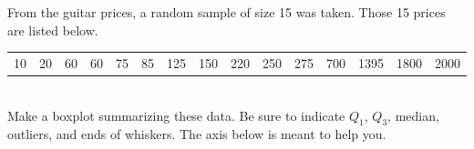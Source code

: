 \documentclass[12pt,letterpaper,addpoints]{exam}
\begin{document}
\begin{questions}

\newpage

\question[8] From the guitar prices, a random sample of size 15 was taken. Those 15 prices are listed below.

\begin{center}
\begin{tabular}{c c c c c c c c c c c c c c c}
10&20&60&60&75&85&125&150&220&250&275&700&1395&1800&2000
\end{tabular}
\end{center}

\\
Make a boxplot summarizing these data. Be sure to indicate $Q_1$, $Q_3$, median, outliers, and ends of whiskers. The axis below is meant to help you. 


\end{questions}
\end{document}

